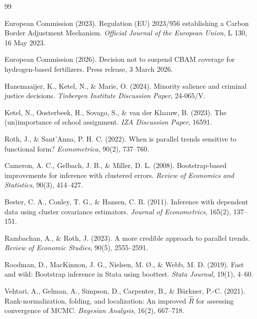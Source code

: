 \documentclass[11pt,a4paper]{article}
\begin{document}

\begin{thebibliography}{99}

European Commission (2023).
\newblock Regulation (EU) 2023/956 establishing a Carbon Border Adjustment Mechanism.
\newblock \textit{Official Journal of the European Union}, L 130, 16 May 2023.

European Commission (2026).
\newblock Decision not to suspend CBAM coverage for hydrogen-based fertilizers.
\newblock Press release, 3 March 2026.

Hanemaaijer, K., Ketel, N., \& Marie, O. (2024).
\newblock Minority salience and criminal justice decisions.
\newblock \textit{Tinbergen Institute Discussion Paper}, 24-065/V.

Ketel, N., Oosterbeek, H., Sovago, S., \& van der Klaauw, B. (2023).
\newblock The (un)importance of school assignment.
\newblock \textit{IZA Discussion Paper}, 16591.

Roth, J., \& Sant'Anna, P. H. C. (2022).
\newblock When is parallel trends sensitive to functional form?
\newblock \textit{Econometrica}, 90(2), 737--760.

Cameron, A. C., Gelbach, J. B., \& Miller, D. L. (2008).
\newblock Bootstrap-based improvements for inference with clustered errors.
\newblock \textit{Review of Economics and Statistics}, 90(3), 414--427.

Bester, C. A., Conley, T. G., \& Hansen, C. B. (2011).
\newblock Inference with dependent data using cluster covariance estimators.
\newblock \textit{Journal of Econometrics}, 165(2), 137--151.

Rambachan, A., \& Roth, J. (2023).
\newblock A more credible approach to parallel trends.
\newblock \textit{Review of Economic Studies}, 90(5), 2555--2591.

Roodman, D., MacKinnon, J. G., Nielsen, M. \O., \& Webb, M. D. (2019).
\newblock Fast and wild: Bootstrap inference in Stata using boottest.
\newblock \textit{Stata Journal}, 19(1), 4--60.

Vehtari, A., Gelman, A., Simpson, D., Carpenter, B., \& Bürkner, P.-C. (2021).
\newblock Rank-normalization, folding, and localization: An improved $\hat{R}$ for assessing convergence of MCMC.
\newblock \textit{Bayesian Analysis}, 16(2), 667--718.

\end{thebibliography}
\end{document}
